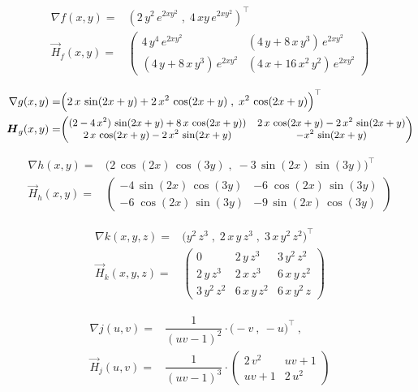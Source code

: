 {\begin{iii}
\item \begin{align*}
\nabla f(x,y)=&\left( 2\,y^2\,e^{2xy^2}\;,\;4\,xy\,e^{2xy^2}\right)^\top\\
\vec H_f(x,y)=&\begin{pmatrix}
4\,y^4\,e^{2xy^2} & (4\,y+8\,x\,y^3)\,e^{2xy^2} \\ 
(4\,y+8\,x\,y^3)\,e^{2xy^2} & (4\,x+16\,x^2\,y^2)\,e^{2xy^2}
\end{pmatrix}
\end{align*}
\item \begin{align*}
\nabla g(x,y)=&\Big( 2\,x\,\sin (2x+y)+2\,x^2\,\cos(2x+y)\;,\;x^2\,\cos (2x+y)\Big)^\top \\
\vec H_g(x,y)=&\small{\begin{pmatrix}
(2-4\,x^2)\,\sin (2x+y)+8\,x\,\cos (2x+y)) & 2\,x\,\cos (2x+y)-2\,x^2\,\sin
(2x+y) \\ 
2\,x\,\cos (2x+y)-2\,x^2\,\sin (2x+y) & -x^2\,\sin (2x+y)
\end{pmatrix}}
\end{align*}
\item \begin{align*}
\nabla h(x,y)=&\Big( 2\,\cos (2x)\,\cos (3y)\;,\;-3\,\sin(2x)\,\sin (3y)\Big)^\top\\
\vec H_h(x,y)=&\begin{pmatrix}
-4\,\sin (2x)\,\cos (3y) & -6\;\cos (2x)\,\sin (3y) \\ 
-6\;\cos (2x)\,\sin (3y) & -9\,\sin (2x)\,\cos (3y)
\end{pmatrix}
\end{align*}
\item \begin{align*}
\nabla k(x,y,z)=&\big(y^2\,z^3\;,\;2\,x\,y\,z^3\;,\;3\,x\,y^2\,z^2\big)^\top\\
\vec H_k(x,y,z)=&
\begin{pmatrix}
0 & 2\,y\,z^3 & 3\,y^2\,z^2 \\ 
2\,y\,z^3 & 2\,x\,z^3 & 6\,x\,y\,z^2 \\ 
3\,y^2\,z^2 & 6\,x\,y\,z^2 & 6\,x\,y^2\,z
\end{pmatrix}
\end{align*}
\item \begin{align*}
\nabla j(u,v) =& \dfrac{1}{(uv-1)^2}\cdot\big( -v\ ,\ -u\big)^\top\ ,\qquad\\
\vec H_j(u,v) =&  \dfrac{1}{(uv-1)^3}\cdot\begin{pmatrix}
2\,v^2 & uv+1 \\
uv +1  & 2\,u^2 
\end{pmatrix}
\end{align*}
\end{iii}
}

% 

